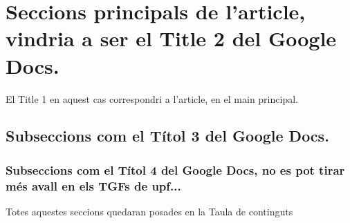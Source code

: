 \section{Seccions principals de l'article, vindria a ser el Title 2 del Google Docs.}
El Title 1 en aquest cas correspondri a l'article,  en el main principal.
\subsection{Subseccions com el Títol 3 del Google Docs.}

\newpage %

\subsubsection{Subseccions com el Títol 4 del Google Docs, no es pot tirar més avall en els TGFs de \acl{upf}...}
Totes aquestes seccions quedaran posades en la Taula de continguts \cite{autor} %
